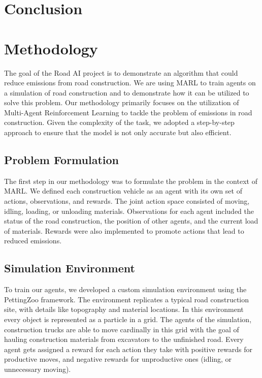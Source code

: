 \documentclass[conference]{IEEEtran}
\begin{document}
	\section{Conclusion}




\section{Methodology}

The goal of the Road AI project is to demonstrate an algorithm that could reduce emissions from road construction.
We are using MARL to train agents on a simulation of road construction and to demonstrate how it can be utilized to solve this problem.
Our methodology primarily focuses on the utilization of Multi-Agent Reinforcement Learning to tackle the problem of emissions in road construction. Given the complexity of the task, we adopted a step-by-step approach to ensure that the model is not only accurate but also efficient.

\subsection{Problem Formulation}
The first step in our methodology was to formulate the problem in the context of MARL. We defined each construction vehicle as an agent with its own set of actions, observations, and rewards. The joint action space consisted of moving, idling, loading, or unloading materials. Observations for each agent included the status of the road construction, the position of other agents, and the current load of materials. Rewards were also implemented to promote actions that lead to reduced emissions.

\subsection{Simulation Environment}
To train our agents, we developed a custom simulation environment using the PettingZoo framework. The environment replicates a typical road construction site, with details like topography and material locations. In this environment every object is represented as a particle in a grid.
The agents of the simulation, construction trucks are able to move cardinally in this grid with the goal of hauling construction materials from excavators to the unfinished road.
Every agent gets assigned a reward for each action they take with positive rewards for productive moves, and negative rewards for unproductive ones (idling, or unnecessary moving).
\end{document}
